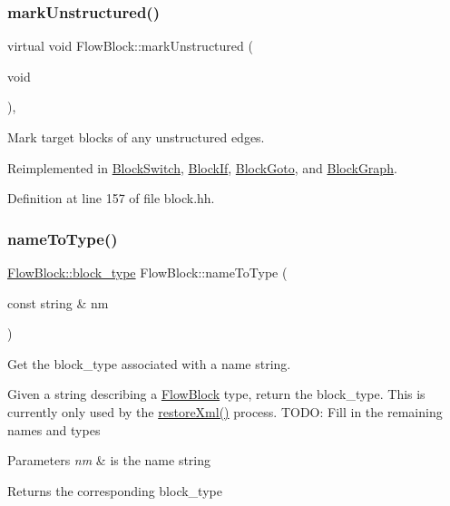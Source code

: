 \subsubsection{\texorpdfstring{markUnstructured()}{markUnstructured()}}
{\footnotesize\ttfamily virtual void Flow\+Block\+::mark\+Unstructured (\begin{DoxyParamCaption}\item[{void}]{ }\end{DoxyParamCaption})\hspace{0.3cm}{\ttfamily [inline]}, {\ttfamily [virtual]}}



Mark target blocks of any unstructured edges. 



Reimplemented in \mbox{\hyperlink{class_block_switch_ac0f9b63b617ff225b3240f8dda6cf56b}{Block\+Switch}}, \mbox{\hyperlink{class_block_if_a7e394df8ba02a9ba48bd9ec239e84d52}{Block\+If}}, \mbox{\hyperlink{class_block_goto_acc562547e24a946794c7583e61208553}{Block\+Goto}}, and \mbox{\hyperlink{class_block_graph_a6047a66449b05bf62b33a2bef8642033}{Block\+Graph}}.



Definition at line 157 of file block.\+hh.

\mbox{\label{class_flow_block_a0d80ab1ac96b718913a58b690357828b}} 
\subsubsection{\texorpdfstring{nameToType()}{nameToType()}}
{\footnotesize\ttfamily \mbox{\hyperlink{class_flow_block_a70df78390870fcdd51e31426ba6a193e}{Flow\+Block\+::block\+\_\+type}} Flow\+Block\+::name\+To\+Type (\begin{DoxyParamCaption}\item[{const string \&}]{nm }\end{DoxyParamCaption})\hspace{0.3cm}{\ttfamily [static]}}



Get the block\+\_\+type associated with a name string. 

Given a string describing a \mbox{\hyperlink{class_flow_block}{Flow\+Block}} type, return the block\+\_\+type. This is currently only used by the \mbox{\hyperlink{class_flow_block_a002ddc14dc84098dcb14b513f8b973c1}{restore\+Xml()}} process. T\+O\+DO\+: Fill in the remaining names and types 
\begin{DoxyParams}{Parameters}
{\em nm} & is the name string \\
\hline
\end{DoxyParams}
\begin{DoxyReturn}{Returns}
the corresponding block\+\_\+type 
\end{DoxyReturn}


